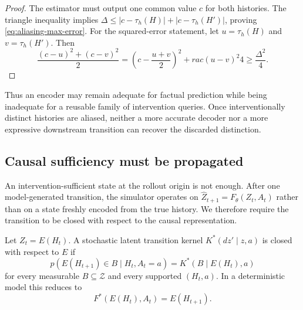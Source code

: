 \begin{proof}
The estimator must output one common value $c$ for both histories. The
triangle inequality implies
$\Delta\leq|c-\tau_h(H)|+|c-\tau_h(H')|$, proving
\eqref{eq:aliasing-max-error}. For the squared-error statement, let
$u=\tau_h(H)$ and $v=\tau_h(H')$. Then
\begin{equation}
    \frac{(c-u)^2+(c-v)^2}{2}
    =\left(c-\frac{u+v}{2}\right)^2+rac{(u-v)^2}{4}
    \geq\frac{\Delta^2}{4}.
\end{equation}
\end{proof}

Thus an encoder may remain adequate for factual prediction while being
inadequate for a reusable family of intervention queries. Once
interventionally distinct histories are aliased, neither a more accurate
decoder nor a more expressive downstream transition can recover the
discarded distinction.

\subsection{Causal sufficiency must be propagated}
\label{sec:transition-closure-theory}

An intervention-sufficient state at the rollout origin is not enough.
After one model-generated transition, the simulator operates on
$\widehat Z_{t+1}=F_\theta(Z_t,A_t)$ rather than on a state freshly
encoded from the true history. We therefore require the transition to be
closed with respect to the causal representation.

\begin{definition}
\label{def:causal-closure}
Let $Z_t=E(H_t)$. A stochastic latent transition kernel
$K^*(dz'\mid z,a)$ is closed with respect to $E$ if
\begin{equation}
    p(E(H_{t+1})\in B\mid H_t,A_t=a)
    =K^*(B\mid E(H_t),a)
    \label{eq:stochastic-closure}
\end{equation}
for every measurable $B\subseteq\mathcal Z$ and every supported
$(H_t,a)$. In a deterministic model this reduces to
\begin{equation}
    F^*(E(H_t),A_t)=E(H_{t+1}).
    \label{eq:deterministic-closure}
\end{equation}
\end{definition}

